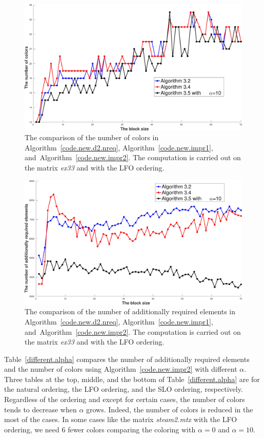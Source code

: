 \documentclass[12pt, twoside,a4paper,toc=bibliography]{scrbook}
\newcommand{\coderef}[1]{Algorithm~\protect\ref{#1}}
\begin{document}
\begin{figure}
\centering
\includegraphics[width=0.9\linewidth]{ex33_alg31_alg32_alg34_alg35_bls_lfo_cols}
\caption{
The comparison of the number of colors in \coderef{code.new.d2.nreq},
\coderef{code.new.impr1}, and~\coderef{code.new.impr2}.
The computation is carried out on the matrix \textit{ex33} and with the LFO ordering.}
\label{ex33_alg31_alg32_alg34_alg35_bls_lfo_cols}
\end{figure}

\begin{figure}
\centering
\includegraphics[width=0.9\linewidth]{ex33_alg31_alg32_alg34_alg35_bls_lfo_adds}
\caption{
The comparison of the number of additionally required elements in \coderef{code.new.d2.nreq},
\coderef{code.new.impr1}, and~\coderef{code.new.impr2}.
The computation is carried out on the matrix \textit{ex33} and with the LFO ordering.}
\label{ex33_alg31_alg32_alg34_alg35_bls_lfo_adds}
\end{figure}

Table~\ref{different.alpha} compares the number of additionally required elements and
the number of colors using \coderef{code.new.impr2} with different $\alpha$.
Three tables at the top, middle, and the bottom of Table~\ref{different.alpha}
are for the natural ordering, the LFO ordering, and the SLO ordering, respectively.
Regardless of the ordering and except for certain cases,
the number of colors tends to decrease when $\alpha$ grows.
Indeed, the number of colors is reduced in the most of the cases. In some cases like
the matrix \textit{steam2.mtx} with the LFO ordering, we need $6$ fewer colors comparing
the coloring with $\alpha=0$ and $\alpha=10$.
\end{document}
